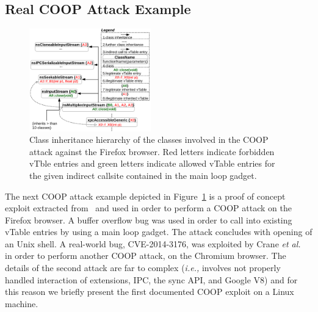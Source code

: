 \subsection{Real COOP Attack Example}
\label{Running Example: CVE X}
\begin{figure}[h!]
    \centering
    \includegraphics[width=0.47\textwidth]{figures/class_hierarchy.pdf}
\caption{Class inheritance hierarchy of the classes involved in the COOP attack against the Firefox browser. Red letters 
indicate forbidden vTble entries and green letters indicate allowed vTable entries for the given indirect callsite
contained in the main loop gadget.}
\label{Class exploit}
\end{figure}
The next COOP attack example depicted in Figure~\ref{Class exploit}
is a proof of concept exploit extracted from~\cite{schuster:coop} and used in order to perform 
a COOP attack on the Firefox browser. A buffer overflow bug was used in order to call 
into existing vTable entries by using a main loop gadget. 
The attack concludes with opening of an Unix shell. 
A real-world bug, CVE-2014-3176, was exploited by Crane \textit{et al.}~\cite{crane:readactor++}
in order to perform another COOP attack, on the Chromium browser. The details of the 
second attack are far to complex (\textit{i.e.,} involves not properly handled interaction of 
extensions, IPC, the sync API, and Google V8) and for this reason we briefly present the first 
documented COOP exploit on a Linux machine.

